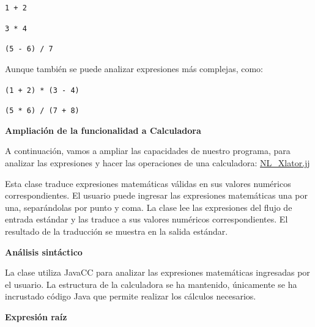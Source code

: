 \begin{center}
	\lstinline|1 + 2|

	\lstinline|3 * 4|

	\lstinline|(5 - 6) / 7|
\end{center}

Aunque también se puede analizar expresiones más complejas, como:

\begin{center}
	\lstinline|(1 + 2) * (3 - 4)|

	\lstinline|(5 * 6) / (7 + 8)|
\end{center}

\phantom{text}

\noindent \textbf{Ampliación de la funcionalidad a Calculadora}
\label{sec:ampliacioncalculadora}

\phantom{text}

\noindent A continuación, vamos a ampliar las capacidades de nuestro programa, para analizar las expresiones y hacer las operaciones de una calculadora: \hyperref[sec:nlxlator]{NL\_Xlator.jj}

%

Esta clase traduce expresiones matemáticas válidas en sus valores numéricos correspondientes. El usuario puede ingresar las expresiones matemáticas una por una, separándolas por punto y coma. La clase lee las expresiones del flujo de entrada estándar y las traduce a sus valores numéricos correspondientes. El resultado de la traducción se muestra en la salida estándar.

\phantom{text}

\noindent \textbf{Análisis sintáctico}

\phantom{text}

\noindent La clase utiliza JavaCC para analizar las expresiones matemáticas ingresadas por el usuario. La estructura de la calculadora se ha mantenido, únicamente se ha incrustado código Java que permite realizar los cálculos necesarios.

\phantom{text}

\noindent \textbf{Expresión raíz}

\phantom{text}


